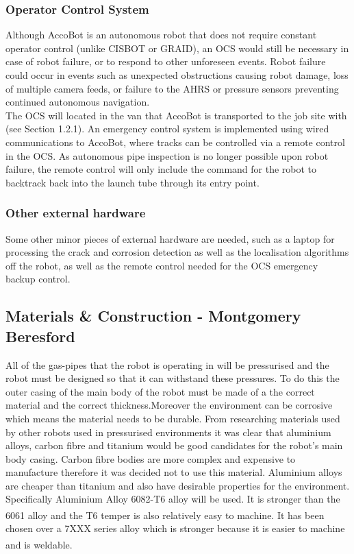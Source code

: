 \documentclass[11pt]{article}		%
\newcommand{\supercite}[1]{\textsuperscript{\cite{#1}}}		%
\begin{document}
		\subsubsection{Operator Control System}
    Although AccoBot is an autonomous robot that does not require constant operator control (unlike CISBOT or GRAID), an OCS would still be necessary in case of robot failure, or to respond to other unforeseen events.  Robot failure could occur in events such as unexpected obstructions causing robot damage, loss of multiple camera feeds, or failure to the AHRS or pressure sensors preventing continued autonomous navigation.
    \\ \hspace*{3ex} The OCS will located in the van that AccoBot is transported to the job site with (see Section 1.2.1). An emergency control system is implemented using wired communications to AccoBot, where tracks can be controlled via a remote control in the OCS. As autonomous pipe inspection is no longer possible upon robot failure, the remote control will only include the command for the robot to backtrack back into the launch tube through its entry point.  
    \subsubsection{Other external hardware}
    Some other minor pieces of external hardware are needed, such as a laptop for processing the crack and corrosion detection as well as the localisation algorithms off the robot, as well as the remote control needed for the OCS emergency backup control. 

		\subsection[Materials \& Construction]{Materials \& Construction - Montgomery Beresford}
		
			
			All of the gas-pipes that the robot is operating in will be pressurised and the robot must be designed so that it can withstand these pressures. To do this the outer casing of the main body of the robot must be made of a the correct material and the correct thickness.Moreover the environment can be corrosive which means the material needs to be durable.
		    From researching materials used by other robots used in pressurised environments it was clear that aluminium alloys, carbon fibre and titanium would be good candidates for the robot’s main body casing. Carbon fibre bodies are more complex and expensive to manufacture therefore it was decided not to use this material. Aluminium alloys are cheaper than titanium and also have desirable properties for the environment.
		    Specifically Aluminium Alloy 6082-T6 alloy will be used. It is stronger than the 6061 alloy and the T6 temper is also relatively easy to machine.\supercite{Aluminium_Alloys}  It has been chosen over a 7XXX series alloy which is stronger because it is easier to machine and is weldable. \supercite{Aluminium_Alloys_differences}
		    
\end{document}
